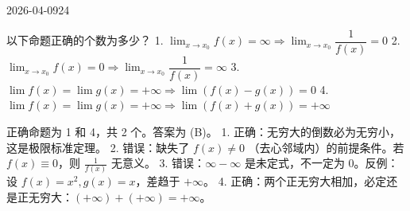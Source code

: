 \begin{mistake}{2026-04-09}{24}

\begin{problemcontent}
以下命题正确的个数为多少？
1. \( \lim_{x \to x_0} f(x) = \infty \Rightarrow \lim_{x \to x_0} \dfrac{1}{f(x)} = 0 \)
2. \( \lim_{x \to x_0} f(x) = 0 \Rightarrow \lim_{x \to x_0} \dfrac{1}{f(x)} = \infty \)
3. \( \lim f(x) = \lim g(x) = +\infty \Rightarrow \lim(f(x) - g(x)) = 0 \)
4. \( \lim f(x) = \lim g(x) = +\infty \Rightarrow \lim(f(x) + g(x)) = +\infty \)
\end{problemcontent}

\begin{solutioncontent}
正确命题为 1 和 4，共 2 个。答案为 (B)。
1. 正确：无穷大的倒数必为无穷小，这是极限标准定理。
2. 错误：缺失了 \( f(x) \neq 0 \) （去心邻域内）的前提条件。若 \( f(x) \equiv 0 \)，则 \( \frac{1}{f(x)} \) 无意义。
3. 错误：\( \infty - \infty \) 是未定式，不一定为 \( 0 \)。反例：设 \( f(x)=x^2, g(x)=x \)，差趋于 \( +\infty \)。
4. 正确：两个正无穷大相加，必定还是正无穷大：\( (+\infty) + (+\infty) = +\infty \)。
\end{solutioncontent}


\end{mistake}
